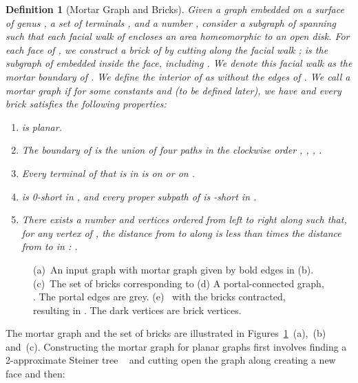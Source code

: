 \documentclass{article}
\newtheorem{definition}[theorem]{Definition}
\begin{document}
\begin{definition}[Mortar Graph and Bricks]\label{def:mg}
  Given a graph  embedded on a surface of genus , a set of
  terminals , and a number , consider a
  subgraph  of  spanning  such that
  each facial walk of  encloses an area homeomorphic to an open
  disk. For each face  of , we construct a \emph{brick}  of
   by cutting  along the facial walk ;  is the
  subgraph of  embedded inside the face, including . We
  denote this facial walk as the \emph{mortar boundary} 
  of . We define the \emph{interior} of  as  without the
  edges of . We call  a \emph{mortar graph} if for
  some constants  and  (to be
  defined later), we have  and every brick 
  satisfies the following properties:
  \begin{enumerate} \item  is planar.
  \item The boundary of  is the union of four paths in the
    clockwise order
    , , , .
  \item Every terminal of  that is in  is on  or on .
  \item  is 0-short in , and every proper subpath of  is
    -short in .
  \item There exists a number  and vertices  ordered from left to right along  such
    that, for any vertex  of , the distance from
     to  along  is less than  times the
    distance from  to  in : .
  \end{enumerate}  
\end{definition}

\begin{figure}
  \centering
  \hfil\hfil
  \subfigure[]{\texttt{[image: BD-MG]}}\hfil\hfil
  \hfil\hfil
  \hfil\hfil
  \caption{(a)~An input graph  with mortar graph  given by bold
    edges in (b). (c)~The set of bricks corresponding to  (d) A
    portal-connected graph, . The portal edges are
    grey.  (e)~ with the bricks contracted, resulting in
    .  The dark vertices are brick vertices. }
  \label{fig:mg} 
\end{figure} 

The mortar graph and the set of bricks are illustrated in
Figures~\ref{fig:mg}~(a),~(b) and~(c).  Constructing the mortar graph
for planar graphs first involves finding a 2-approximate Steiner tree
~\cite{Mehlhorn88} and cutting open the graph along  creating a new face  and then: 
\end{document}
